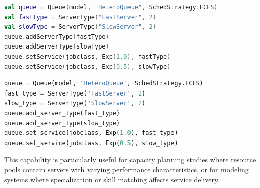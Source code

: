 \begin{KOTLIN}
\begin{lstlisting}[language = kotlin, basicstyle=\ttfamily\scriptsize]
val queue = Queue(model, "HeteroQueue", SchedStrategy.FCFS)
val fastType = ServerType("FastServer", 2)
val slowType = ServerType("SlowServer", 2)
queue.addServerType(fastType)
queue.addServerType(slowType)
queue.setService(jobclass, Exp(1.0), fastType)
queue.setService(jobclass, Exp(0.5), slowType)
\end{lstlisting}
\end{KOTLIN}
\begin{PYTHON}
\begin{lstlisting}[language = python]
queue = Queue(model, 'HeteroQueue', SchedStrategy.FCFS)
fast_type = ServerType('FastServer', 2)
slow_type = ServerType('SlowServer', 2)
queue.add_server_type(fast_type)
queue.add_server_type(slow_type)
queue.set_service(jobclass, Exp(1.0), fast_type)
queue.set_service(jobclass, Exp(0.5), slow_type)
\end{lstlisting}
\end{PYTHON}
This capability is particularly useful for capacity planning studies where resource pools contain servers with varying performance characteristics, or for modeling systems where specialization or skill matching affects service delivery.

